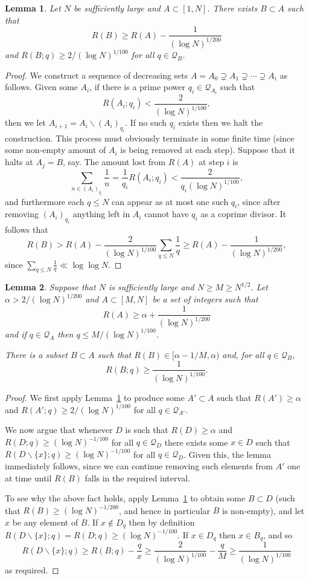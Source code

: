 \documentclass[12pt]{amsart}
\newtheorem{lemma}{Lemma}
\begin{document}
\begin{lemma}\label{lem-pisqa}
Let $N$ be sufficiently large and $A\subset [1,N]$. There exists $B\subset A$ such that 
\[R(B)\geq  R(A)-\frac{1}{(\log N)^{1/200}}\]
and $R(B;q)\geq 2/(\log N)^{1/100}$ for all $q\in \mathcal{Q}_B$. 
\end{lemma}
\begin{proof}
We construct a sequence of decreasing sets $A=A_0\supsetneq A_1\supsetneq\cdots \supsetneq A_i$ as follows. Given some $A_i$, if there is a prime power $q_i\in\mathcal{Q}_{A_i}$ such that 
\[R(A_i;q_i)< \frac{2}{(\log N)^{1/100}},\]
then we let $A_{i+1}=A_i\backslash (A_i)_{q_i}$. If no such $q_i$ exists then we halt the construction. This process must obviously terminate in some finite time (since some non-empty amount of $A_i$ is being removed at each step). Suppose that it halts at $A_j=B$, say. The amount lost from $R(A)$ at step $i$ is
\[\sum_{n\in (A_i)_{q_i}}\frac{1}{n}=\frac{1}{q_i}R(A_i;q_i)< \frac{2}{q_i(\log N)^{1/100}},\]
and furthermore each $q\leq N$ can appear as at most one such $q_i$, since after removing $(A_i)_{q_i}$ anything left in $A_i$ cannot have $q_i$ as a coprime divisor. It follows that
\[R(B)> R(A) -\frac{2}{(\log N)^{1/100}}\sum_{q\leq N}\frac{1}{q}\geq R(A)-\frac{1}{(\log N)^{1/200}},\]
since $\sum_{q\leq N}\frac{1}{q}\ll \log\log N$.
\end{proof}
\begin{lemma}\label{lem-pisq}
Suppose that $N$ is sufficiently large and $N\geq M\geq N^{1/2}$. Let $\alpha > 2/(\log N)^{1/200}$ and $A\subset [M,N]$ be a set of integers such that
\[R(A) \geq \alpha+\frac{1}{(\log N)^{1/200}}\]
and if $q\in\mathcal{Q}_A$ then $q\leq M/(\log N)^{1/100}$.

There is a subset $B\subset A$ such that $R(B)\in [\alpha-1/M,\alpha)$ and, for all $q\in \mathcal{Q}_B$, 
\[R(B;q)\geq \frac{1}{(\log N)^{1/100}}.\]
\end{lemma}
\begin{proof}
We first apply Lemma~\ref{lem-pisqa} to produce some $A'\subset A$ such that $R(A')\geq \alpha$ and $R(A';q) \geq 2/(\log N)^{1/100}$ for all $q\in\mathcal{Q}_{A'}$. 

We now argue that whenever $D$ is such that $R(D)\geq \alpha$ and $R(D;q) \geq (\log N)^{-1/100}$ for all $q\in \mathcal{Q}_D$ there exists some $x\in D$ such that $R(D\backslash \{x\};q)\geq (\log N)^{-1/100}$ for all $q\in\mathcal{Q}_{D}$. Given this, the lemma immediately follows, since we can continue removing such elements from $A'$ one at time until $R(B)$ falls in the required interval. 

To see why the above fact holds, apply Lemma~\ref{lem-pisqa} to obtain some $B\subset D$ (such that $R(B)\geq (\log N)^{-1/200}$, and hence in particular $B$ is non-empty), and let $x$ be any element of $B$. If $x\not\in D_q$ then by definition $R(D\backslash\{x\};q)=R(D;q)\geq (\log N)^{-1/100}$. If $x\in D_q$ then $x\in B_q$, and so
\[R(D\backslash\{x\};q)\geq R(B;q)-\frac{q}{x}\geq \frac{2}{(\log N)^{1/100}}-\frac{q}{M}\geq \frac{1}{(\log N)^{1/100}}\]
as required.
\end{proof}
\end{document}
